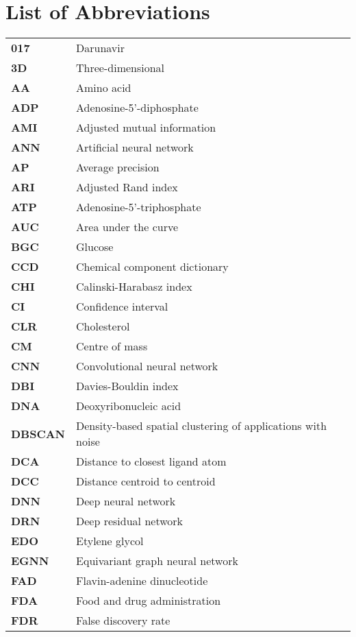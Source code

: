 \chapter*{List of Abbreviations}

\begin{longtable}[l]{@{}p{2.5cm}p{12cm}@{}}
\textbf{017} & Darunavir \\
\textbf{3D} & Three-dimensional \\
\textbf{AA} & Amino acid \\
\textbf{ADP} & Adenosine-5'-diphosphate \\
\textbf{AMI} & Adjusted mutual information \\
\textbf{ANN} & Artificial neural network \\
\textbf{AP} & Average precision \\
\textbf{ARI} & Adjusted Rand index \\
\textbf{ATP} & Adenosine-5’-triphosphate \\
\textbf{AUC} & Area under the curve \\
\textbf{BGC} & Glucose \\
\textbf{CCD} & Chemical component dictionary \\
\textbf{CHI} & Calinski-Harabasz index \\
\textbf{CI} & Confidence interval \\
\textbf{CLR} & Cholesterol \\
\textbf{CM} & Centre of mass \\
\textbf{CNN} & Convolutional neural network \\
\textbf{DBI} & Davies-Bouldin index \\
\textbf{DNA} & Deoxyribonucleic acid \\
\textbf{DBSCAN} & Density-based spatial clustering of applications with noise \\
\textbf{DCA} & Distance to closest ligand atom \\
\textbf{DCC} & Distance centroid to centroid \\
\textbf{DNN} & Deep neural network \\
\textbf{DRN} & Deep residual network \\
\textbf{EDO} & Etylene glycol \\
\textbf{EGNN} & Equivariant graph neural network \\
\textbf{FAD} & Flavin-adenine dinucleotide \\
\textbf{FDA} & Food and drug administration \\
\textbf{FDR} & False discovery rate \\

\end{longtable}
